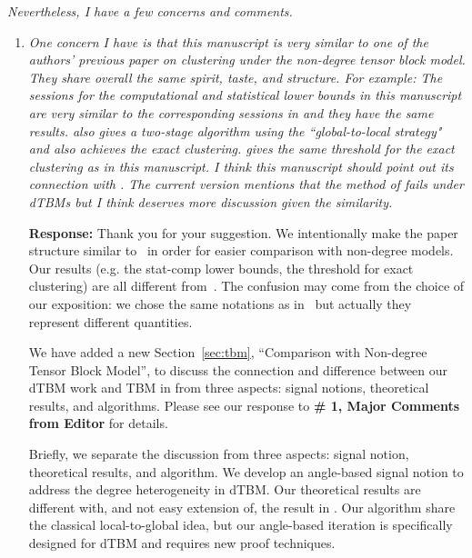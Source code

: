 \documentclass[11pt]{article}
\theoremstyle{definition}
\theoremstyle{definition}
\begin{document}
\textit{Nevertheless, I have a few concerns and comments.}

\begin{enumerate}[wide, labelwidth=!, labelindent=0pt]

\item \textit{One concern I have is that this manuscript is very similar to one of the authors' previous paper \cite{han2020exact} on clustering under the non-degree tensor block model. They share overall the same spirit, taste, and structure. For example:
The sessions for the computational and statistical lower bounds in this manuscript are very similar to the corresponding sessions in \cite{han2020exact} and they have the same results.
\cite{han2020exact} also gives a two-stage algorithm using the ``global-to-local strategy" and also achieves the exact clustering. \cite{han2020exact} gives the same threshold for the exact clustering as in this manuscript.
I think this manuscript should point out its connection with \cite{han2020exact}. The current version mentions that the method of \cite{han2020exact} fails under dTBMs but I think \cite{han2020exact} deserves more discussion given the similarity.}

\textbf{Response:} Thank you for your suggestion. We intentionally make the paper structure similar to~\cite{han2020exact} in order for easier comparison with non-degree models. Our results (e.g. the stat-comp lower bounds, the threshold for exact clustering) are all different from~\cite{han2020exact}. The confusion may come from the choice of our exposition: we chose the same notations as in~\cite{han2020exact} but actually they represent different quantities. 

We have added a new Section~\ref{sec:tbm}, ``Comparison with Non-degree Tensor Block Model'', to discuss the connection and difference between our dTBM work and TBM in \cite{han2020exact} from three aspects: signal notions, theoretical results, and algorithms. Please see our response to {\bf \# 1, Major Comments from Editor} for details. 


Briefly, we separate the discussion from three aspects: signal notion, theoretical results, and algorithm. We develop an angle-based signal notion to address the degree heterogeneity in dTBM. Our theoretical results are different with, and not easy extension of, the result in \cite{han2020exact}. Our algorithm share the classical local-to-global idea, but our angle-based iteration is specifically designed for dTBM and requires new proof techniques.  




\end{enumerate}
\end{document}
